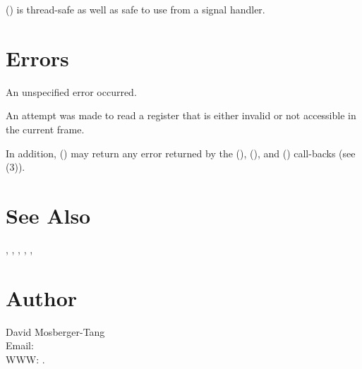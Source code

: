 \documentclass{article}
\begin{document}
() is thread-safe as well as safe to use
from a signal handler.

\section{Errors}

\begin{Description}
\item[\Const{UNW\_EUNSPEC}] An unspecified error occurred.
\item[\Const{UNW\_EBADREG}] An attempt was made to read a register
  that is either invalid or not accessible in the current frame.
\end{Description}
In addition, () may return any error returned by
the (), (), and
() call-backs (see
(3)).

\section{See Also}

,
,
,
,
,

\section{Author}

\noindent
David Mosberger-Tang\\
Email: \\
WWW: .
\LatexManEnd
\end{document}
